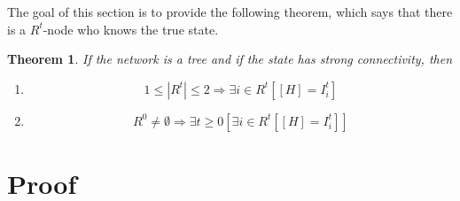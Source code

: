 \documentclass[12pt]{article}
\newtheorem{theorem}{Theorem}[section]
\theoremstyle{remark}
\theoremstyle{remark}
\begin{document}
The goal of this section is to provide the following theorem, which says that there is a $R^t$-node who knows the true state. 
\begin{theorem}
\label{lemma_empty}
If the network is a tree and if the state has strong connectivity, then 
\begin{enumerate}
\item  \[1\leq |R^{t}|\leq 2 \Rightarrow \exists i\in R^t[[H]= I^t_i]\]
\item \[R^0\neq \emptyset \Rightarrow \exists t\geq 0[\exists i\in R^t[[H]= I^t_i]]\]
\end{enumerate}
\end{theorem}














\appendix
\section{Proof}
\end{document}
